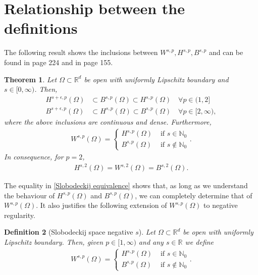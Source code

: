 \documentclass[
    a4paper,
    DIV=14,
    abstract=true,
    numbers=noenddot
]
{scrartcl}
\newtheorem{theorem}{Theorem}[section]
\newtheorem{definition}[theorem]{Definition}
\theoremstyle{definition}
\newcommand{\N}{\mathbb{N}}
\newcommand{\R}{\mathbb{R}}
\begin{document}
\section{Relationship between the definitions}
The following result shows the inclusions between $W^{s,p},H^{s,p},B^{s,p}$ and can be found in \cite{agranovich2015sobolev} page 224 and in \cite{stein1970singular} page 155.
\begin{theorem}\label{equivalence fractional spaces}
    Let $\Omega \subset \R^d$ be open with uniformly Lipschitz boundary and $s \in [0,\infty)$. Then,
    \begin{align*}
        H^{s+\epsilon,p}(\Omega ) & \subset B^{s,p}(\Omega )  \subset H^{s,p}(\Omega )\quad \forall p \in (1,2]       \\
        B^{s+\epsilon,p}(\Omega ) & \subset H^{s,p}(\Omega )  \subset B^{s,p}(\Omega )\quad \forall p \in [2,\infty),
    \end{align*}
    where the above inclusions are continuous and dense. Furthermore,
    \begin{align}\label{Slobodeckij equivalence}
        W^{s,p}(\Omega )= \begin{cases}
                              H^{s,p}(\Omega ) & \text{ if } s \in \N_0    \\
                              B^{s,p}(\Omega ) & \text{ if } s \notin \N_0
                          \end{cases}.
    \end{align}
    In consequence, for $p=2$,
    \begin{align}\label{p=2}
        H^{s,2}(\Omega )=W^{s,2}(\Omega )=B^{s,2}(\Omega ).
    \end{align}
\end{theorem}
The equality in \eqref{Slobodeckij equivalence} shows that, as long as we understand the behaviour of $H^{s,p}(\Omega )$ and $B^{s,p}(\Omega )$, we can completely determine that of $W^{s,p}(\Omega )$. It also justifies the following extension of $W^{s,p}(\Omega )$ to negative regularity.
\begin{definition}[Slobodeckij space negative $s$]\label{negative s Slobodeckij}
    Let $\Omega \subset \R^d$ be open with uniformly Lipschitz boundary. Then, given $p \in [1,\infty)$ and any  $s \in \R$ we define
    \begin{align*}
        W^{s,p}(\Omega )= \begin{cases}
                              H^{s,p}(\Omega ) & \text{ if } s \in \N_0    \\
                              B^{s,p}(\Omega ) & \text{ if } s \notin \N_0
                          \end{cases}.
    \end{align*}
\end{definition}
\end{document}
